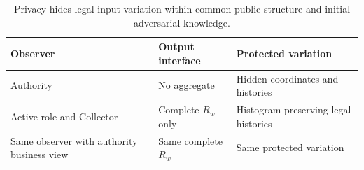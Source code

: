 \begin{table}[t]
\centering
\caption{Privacy hides legal input variation within common public structure and initial adversarial knowledge.}
\label{tab:privacy-domain}
\footnotesize
\begin{tabularx}{\columnwidth}{@{}YYY@{}}
\toprule
Observer & Output interface & Protected variation \\
\midrule
Authority & No aggregate & Hidden coordinates and histories \\
Active role and Collector & Complete \(R_w\) only & Histogram-preserving legal histories \\
Same observer with authority business view & Same complete \(R_w\) & Same protected variation \\
\bottomrule
\end{tabularx}
\end{table}

